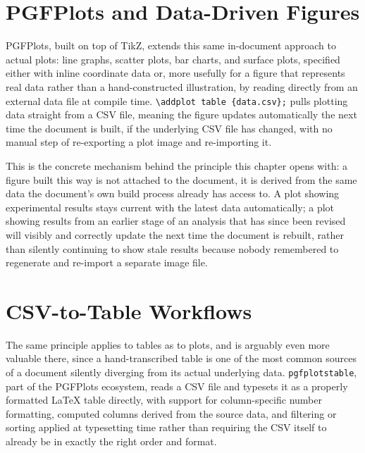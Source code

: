 \hypertarget{pgfplots-and-data-driven-figures}{%
\section{PGFPlots and Data-Driven Figures}\label{pgfplots-and-data-driven-figures}}

PGFPlots, built on top of TikZ, extends this same in-document approach to actual plots: line graphs, scatter plots, bar charts, and surface plots, specified either with inline coordinate data or, more usefully for a figure that represents real data rather than a hand-constructed illustration, by reading directly from an external data file at compile time. \texttt{\textbackslash{}addplot\ table\ \{data.csv\};} pulls plotting data straight from a CSV file, meaning the figure updates automatically the next time the document is built, if the underlying CSV file has changed, with no manual step of re-exporting a plot image and re-importing it.

This is the concrete mechanism behind the principle this chapter opens with: a figure built this way is not attached to the document, it is derived from the same data the document's own build process already has access to. A plot showing experimental results stays current with the latest data automatically; a plot showing results from an earlier stage of an analysis that has since been revised will visibly and correctly update the next time the document is rebuilt, rather than silently continuing to show stale results because nobody remembered to regenerate and re-import a separate image file.

\hypertarget{csv-to-table-workflows}{%
\section{CSV-to-Table Workflows}\label{csv-to-table-workflows}}

The same principle applies to tables as to plots, and is arguably even more valuable there, since a hand-transcribed table is one of the most common sources of a document silently diverging from its actual underlying data. \texttt{pgfplotstable}, part of the PGFPlots ecosystem, reads a CSV file and typesets it as a properly formatted LaTeX table directly, with support for column-specific number formatting, computed columns derived from the source data, and filtering or sorting applied at typesetting time rather than requiring the CSV itself to already be in exactly the right order and format.

